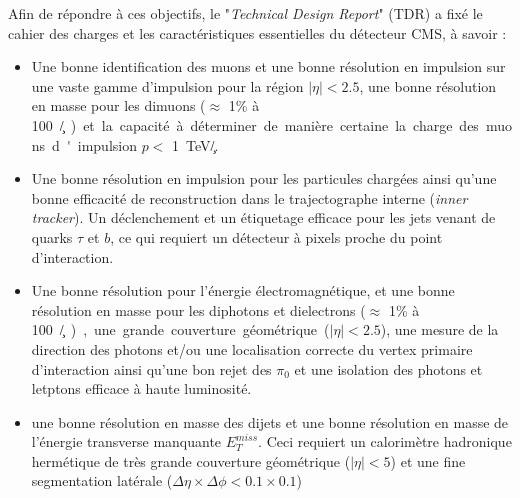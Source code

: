 Afin de répondre à ces objectifs, le "\textit{Technical Design Report}" (TDR) \cite{Bayatian:922757} a fixé le cahier des charges et les caractéristiques essentielles du détecteur CMS, à savoir :
\begin{itemize}[label=$\bullet$]
	\item Une bonne identification des muons et une bonne résolution en impulsion sur une vaste gamme d'impulsion pour la région $|\eta|<2.5$, une bonne résolution en masse pour les dimuons ($\approx$ \num{1}\% à \SI{100}{\giga\eV/\square\c}) et la capacité à déterminer de manière certaine la charge des muons d'impulsion $p<$ \SI{1}{\tera\eV/\c}.
	\item Une bonne résolution en impulsion pour les particules chargées ainsi qu'une bonne efficacité de reconstruction dans le trajectographe interne (\textit{inner tracker}). Un déclenchement et un étiquetage efficace pour les jets venant de quarks $\tau$ et $b$, ce qui requiert un détecteur à pixels proche du point d'interaction.
	\item Une bonne résolution pour l'énergie électromagnétique, et une bonne résolution en masse pour les diphotons et dielectrons  ($\approx$ \num{1}\% à \SI{100}{\giga\eV/\square\c}), une grande couverture géométrique ($|\eta|<2.5$), une mesure de la direction des photons et/ou une localisation correcte du vertex primaire d'interaction ainsi qu'une bon rejet des $\pi_{0}$ et une isolation des photons et letptons efficace à haute luminosité.
	\item une bonne résolution en masse des dijets et une bonne résolution en masse de l'énergie transverse manquante $E_{T}^{miss}$. Ceci requiert un calorimètre hadronique hermétique de très grande couverture géométrique ($|\eta|<5$) et une fine segmentation latérale ($\Delta\eta\times\Delta\phi<0.1\times0.1$)
\end{itemize} 

